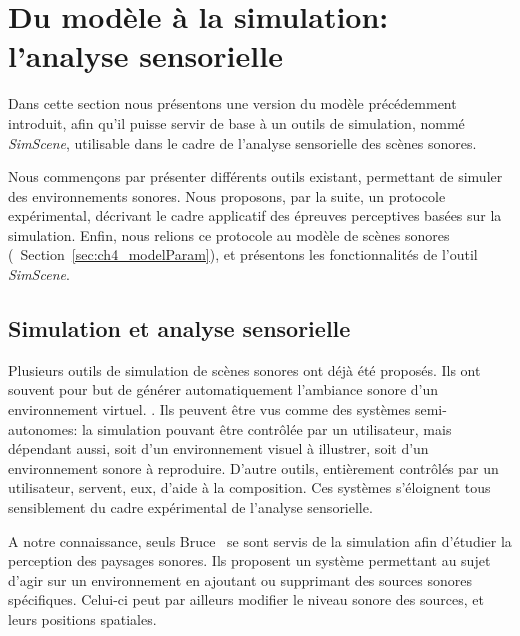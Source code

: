 
\section{Du modèle à la simulation: l'analyse sensorielle}
\label{sec:ch4_modAnaSo}

Dans cette section nous présentons une version du modèle précédemment introduit, afin qu'il puisse servir de base à un outils de simulation, nommé \emph{SimScene}, utilisable dans le cadre de l'analyse sensorielle des scènes sonores.

Nous commençons par présenter différents outils  existant, permettant de simuler des environnements sonores. Nous proposons, par la suite, un protocole expérimental, décrivant le cadre applicatif des épreuves perceptives basées sur la simulation. Enfin, nous relions ce protocole au modèle de scènes sonores (\cf~Section~\ref{sec:ch4_modelParam}), et présentons les fonctionnalités de l'outil \emph{SimScene}.

\subsection{Simulation et analyse sensorielle}

Plusieurs outils de simulation de scènes sonores ont déjà été proposés\citep{misra2006new,misra2007musical,valle2009framework,finney2010soundscape,schirosa2010system}. Ils ont souvent pour but de générer automatiquement l'ambiance sonore d'un environnement virtuel. \citep{valle2009framework,finney2010soundscape}. Ils peuvent être vus comme des systèmes semi-autonomes: la simulation pouvant être contrôlée par un utilisateur, mais dépendant aussi, soit d'un environnement visuel à illustrer, soit d'un environnement sonore à reproduire. D'autre outils, entièrement contrôlés par un utilisateur, servent, eux, d'aide à la composition\citep{misra2006new,misra2007musical}. Ces systèmes s'éloignent tous sensiblement du cadre expérimental de l'analyse sensorielle.

A notre connaissance, seuls Bruce~\al \citep{bruce2009development,bruce2014effects} se sont servis de la simulation afin d'étudier la perception des paysages sonores. Ils proposent  un système permettant au sujet d'agir sur un environnement en ajoutant ou supprimant des sources sonores spécifiques. Celui-ci peut par ailleurs modifier le niveau sonore des sources, et leurs positions spatiales.

